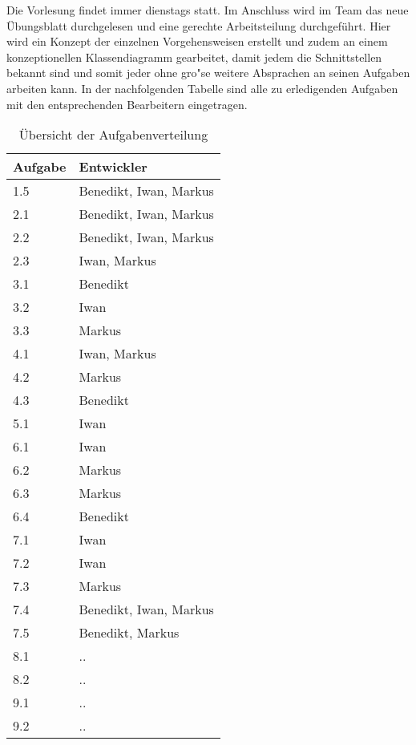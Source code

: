 Die Vorlesung findet immer dienstags statt.
Im Anschluss wird im Team das neue \"Ubungsblatt durchgelesen und eine gerechte Arbeitsteilung durchgef\"uhrt.
Hier wird ein Konzept der einzelnen Vorgehensweisen erstellt und zudem an einem konzeptionellen Klassendiagramm gearbeitet, damit jedem die Schnittstellen bekannt sind und somit jeder ohne gro"se weitere Absprachen an seinen Aufgaben arbeiten kann.
In der nachfolgenden Tabelle sind alle zu erledigenden Aufgaben mit den entsprechenden Bearbeitern eingetragen.


\vspace{1em}
\begin{table}[!h]
    \centering
    \begin{tabular}{|l|l|}
        \hline
        \textbf{Aufgabe} & \textbf{Entwickler} \\
        \hline
        1.5 & Benedikt, Iwan, Markus \\
        \hline
        2.1 & Benedikt, Iwan, Markus \\
        \hline
        2.2 & Benedikt, Iwan, Markus \\
        \hline
        2.3 & Iwan, Markus \\
        \hline
        3.1 & Benedikt \\
        \hline
        3.2 & Iwan \\
        \hline
        3.3 & Markus \\
        \hline
        4.1 & Iwan, Markus \\
        \hline
        4.2 & Markus \\
        \hline
        4.3 & Benedikt \\
        \hline
        5.1 & Iwan \\
        \hline
        6.1 & Iwan \\
        \hline
        6.2 & Markus \\
        \hline
        6.3 & Markus \\
        \hline
        6.4 & Benedikt \\
        \hline
        7.1 & Iwan \\
        \hline
        7.2 & Iwan \\
        \hline
        7.3 & Markus \\
        \hline
        7.4 & Benedikt, Iwan, Markus \\
        \hline
        7.5 & Benedikt, Markus \\
        \hline
        8.1 & .. \\
        \hline
        8.2 & .. \\
        \hline
        9.1 & .. \\
        \hline
        9.2 & .. \\
        \hline
    \end{tabular}
    \caption{Übersicht der Aufgabenverteilung}
    \label{tab:arbeitsverteilung}
\end{table}


